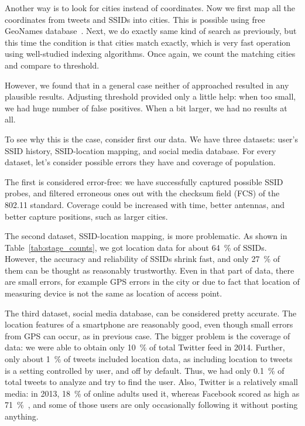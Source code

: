 \documentclass[12pt,a4paper,oneside,pdftex]{report}
\begin{document}
Another way is to look for cities instead of coordinates. Now we first map all the coordinates from tweets and SSIDs into cities. This is possible using free GeoNames database~\cite{geonames}. Next, we do exactly same kind of search as previously, but this time the condition is that cities match exactly, which is very fast operation using well-studied indexing algorithms. Once again, we count the matching cities and compare to threshold.

However, we found that in a general case neither of approached resulted in any plausible results. Adjusting threshold provided only a little help: when too small, we had huge number of false positives. When a bit larger, we had no results at all.

To see why this is the case, consider first our data. We have three datasets: user's SSID history, SSID-location mapping, and social media database. For every dataset, let's consider possible errors they have and coverage of population.

The first is considered error-free: we have successfully captured possible SSID probes, and filtered erroneous ones out with the checksum field (FCS) of the 802.11 standard. Coverage could be increased with time, better antennas, and better capture positions, such as larger cities.

The second dataset, SSID-location mapping, is more problematic. As shown in Table~\ref{tab:stage_counts}, we got location data for about 64~\% of SSIDs. However, the accuracy and reliability of SSIDs shrink fast, and only 27~\% of them can be thought as reasonably trustworthy. Even in that part of data, there are small errors, for example GPS errors in the city or due to fact that location of measuring device is not the same as location of access point.

The third dataset, social media database, can be considered pretty accurate. The location features of a smartphone are reasonably good, even though small errors from GPS can occur, as in previous case. The bigger problem is the coverage of data: we were able to obtain only 10~\% of total Twitter feed in 2014. Further, only about 1~\% of tweets included location data, as including location to tweets is a setting controlled by user, and off by default. Thus, we had only 0.1~\% of total tweets to analyze and try to find the user. Also, Twitter is a relatively small media: in 2013, 18~\% of online adults used it, whereas Facebook scored as high as 71~\%~\cite{pew_socialmedia}, and some of those users are only occasionally following it without posting anything.
\end{document}
